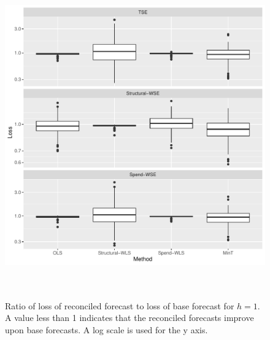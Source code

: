 \documentclass[12pt]{article}
\theoremstyle{definition}
\begin{document}
\begin{figure}[!hbt]
    \centering
    \small
    \includegraphics[width = \textwidth, height=14cm]{Figs/lossboxplots_1.pdf}
    \caption{{\color{blue} Ratio of loss of reconciled forecast to loss of base forecast for $h = 1$. A value less than 1 indicates that the reconciled forecasts improve upon base forecasts.  A log scale is used for the y axis.}}\label{fig:BaseVSRecon_Fc}
\end{figure}

\end{document}
